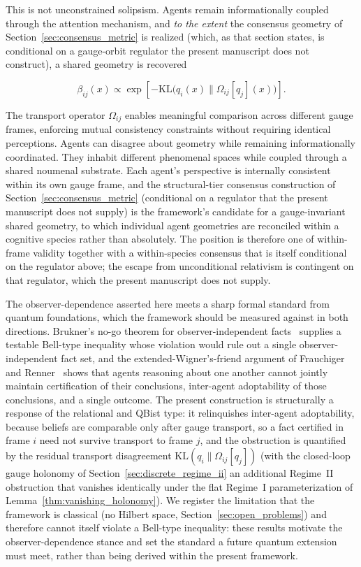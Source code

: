 \documentclass[11pt]{article}
\begin{document}
This is not unconstrained solipsism. Agents remain informationally coupled through the attention mechanism, and \emph{to the extent} the consensus geometry of Section~\ref{sec:consensus_metric} is realized (which, as that section states, is conditional on a gauge-orbit regulator the present manuscript does not construct), a shared geometry is recovered

\begin{equation}
\beta_{ij}(x) \propto \exp\left[-\mathrm{KL}\big(q_i(x) \| \Omega_{ij}[q_j](x)\big)\right].
\end{equation}

The transport operator $\Omega_{ij}$ enables meaningful comparison across different gauge frames, enforcing mutual consistency constraints without requiring identical perceptions. Agents can disagree about geometry while remaining informationally coordinated.  They inhabit different phenomenal spaces while coupled through a shared noumenal substrate. Each agent's perspective is internally consistent within its own gauge frame, and the structural-tier consensus construction of Section~\ref{sec:consensus_metric} (conditional on a regulator that the present manuscript does not supply) is the framework's candidate for a gauge-invariant shared geometry, to which individual agent geometries are reconciled within a cognitive species rather than absolutely. The position is therefore one of within-frame validity together with a within-species consensus that is itself conditional on the regulator above; the escape from unconditional relativism is contingent on that regulator, which the present manuscript does not supply.

The observer-dependence asserted here meets a sharp formal standard from quantum foundations, which the framework should be measured against in both directions. Brukner's no-go theorem for observer-independent facts~\cite{Brukner2018} supplies a testable Bell-type inequality whose violation would rule out a single observer-independent fact set, and the extended-Wigner's-friend argument of Frauchiger and Renner~\cite{frauchiger2018quantum} shows that agents reasoning about one another cannot jointly maintain certification of their conclusions, inter-agent adoptability of those conclusions, and a single outcome. The present construction is structurally a response of the relational and QBist type: it relinquishes inter-agent adoptability, because beliefs are comparable only after gauge transport, so a fact certified in frame $i$ need not survive transport to frame $j$, and the obstruction is quantified by the residual transport disagreement $\mathrm{KL}(q_i \| \Omega_{ij}[q_j])$ (with the closed-loop gauge holonomy of Section~\ref{sec:discrete_regime_ii} an additional Regime~II obstruction that vanishes identically under the flat Regime~I parameterization of Lemma~\ref{thm:vanishing_holonomy}). We register the limitation that the framework is classical (no Hilbert space, Section~\ref{sec:open_problems}) and therefore cannot itself violate a Bell-type inequality: these results motivate the observer-dependence stance and set the standard a future quantum extension must meet, rather than being derived within the present framework.
\end{document}
